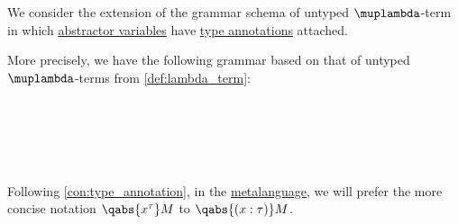 \begin{definition}\label{def:typed_lambda_term}\mimprovised
  We consider the extension of the grammar schema of untyped \( \muplambda \)-term in which \hyperref[def:lambda_abstractor]{abstractor variables} have \hyperref[con:type_annotation]{type annotations} attached.

  More precisely, we have the following grammar based on that of untyped \( \muplambda \)-terms from \cref{def:lambda_term}:
  \begin{bnf*}
     { \bnfsp \bnftsq{:} \bnfsp {}} \\
                   { \bnfsp {}} \\
      {\bnftsq{\( ( \)} \bnfsp {} \bnfsp {} \bnfsp \bnftsq{\( ) \)}} \\
      {\bnftsq{\( ( \)} \bnfsp \bnftsq{\( \synlambda \)} \bnfsp {} \bnfsp {} \bnfsp {} \bnfsp \bnftsq{\( ) \)}} \\
             { \bnfor {} \bnfor {}}
  \end{bnf*}

  Following \cref{con:type_annotation}, in the \hyperref[con:metalanguage]{metalanguage}, we will prefer the more concise notation \( \qabs {x^\tau} M \) to \( \qabs {(x: \tau)} M \).
\end{definition}
